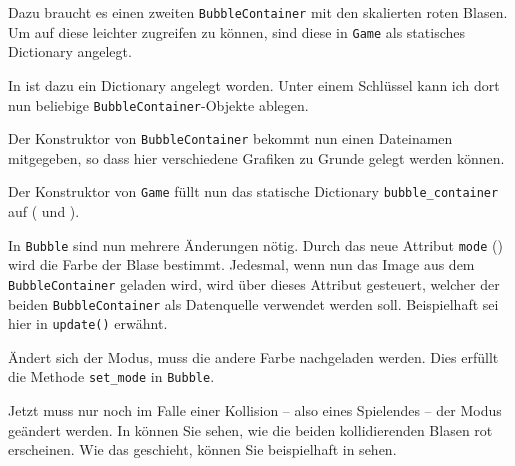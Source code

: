 Dazu braucht es einen zweiten \texttt{BubbleContainer} mit den skalierten roten Blasen. Um auf diese leichter zugreifen zu können, sind diese in \texttt{Game} als statisches Dictionary angelegt. 

In  ist dazu ein Dictionary angelegt worden. Unter einem Schlüssel kann ich dort nun beliebige \texttt{BubbleContainer}-Objekte ablegen.


Der Konstruktor von \texttt{BubbleContainer} bekommt nun einen Dateinamen mitgegeben, so dass hier verschiedene Grafiken zu Grunde gelegt werden können.


Der Konstruktor von \texttt{Game} füllt nun das statische Dictionary \texttt{bubble\_container} auf ( und ).


In \texttt{Bubble} sind nun mehrere Änderungen nötig. Durch das neue Attribut \texttt{mode} () wird die Farbe der Blase bestimmt. Jedesmal, wenn nun das Image aus dem \texttt{Bubble\-Con\-tainer} geladen wird, wird über dieses Attribut gesteuert, welcher der beiden \texttt{Bubble\-Con\-tainer} als Datenquelle verwendet werden soll. Beispielhaft sei hier  in \texttt{update()} erwähnt.


Ändert sich der Modus, muss die andere Farbe nachgeladen werden. Dies erfüllt die Methode \texttt{set\_mode} in \texttt{Bubble}.


Jetzt muss nur noch im Falle einer Kollision -- also eines Spielendes -- der Modus geändert werden. In  können Sie sehen, wie die beiden kollidierenden Blasen rot erscheinen. Wie das geschieht, können Sie beispielhaft in  sehen.

